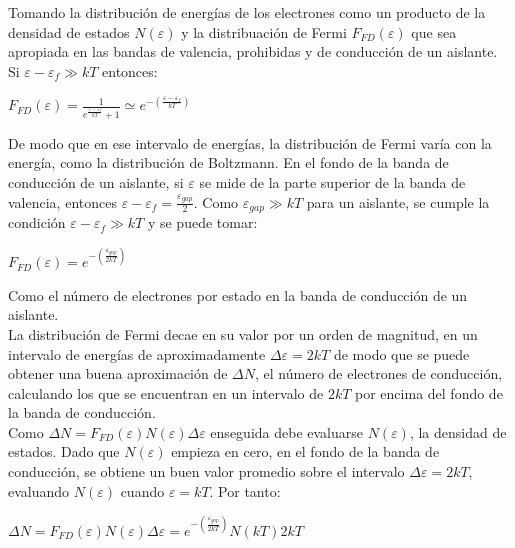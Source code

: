 \documentclass[oneside]{book}
\numberwithin{equation}{section}
\numberwithin{figure}{section}
\numberwithin{table}{section}
\begin{document}
				Tomando la distribución de energías de los electrones como un producto de la densidad de estados $N(\varepsilon)$ y la distribuación de Fermi $F_{FD}(\varepsilon)$ que sea apropiada en las bandas de valencia, prohibidas y de conducción de un aislante. Si $\varepsilon-\varepsilon_f \gg kT$ entonces:
				
				\begin{center}
					$\displaystyle F_{FD}(\varepsilon)=\frac{1}{e^{\frac{\varepsilon-\varepsilon_f}{kT}}+1} \simeq e^{-\left(\frac{\varepsilon-\varepsilon_f}{kT}\right)}$
				\end{center}
			
				De modo que en ese intervalo de energías, la distribución de Fermi varía con la energía, como la distribución de Boltzmann. En el fondo de la banda de conducción de un aislante, si $\varepsilon$ se mide de la parte superior de la banda de valencia, entonces $\displaystyle \varepsilon-\varepsilon_f=\frac{\varepsilon_{gap}}{2}$. Como $\varepsilon_{gap} \gg kT$ para un aislante, se cumple la condición $\varepsilon-\varepsilon_f \gg kT$ y se puede tomar:
				
				\begin{center}
					$\displaystyle F_{FD}(\varepsilon)=e^{-\left(\frac{\varepsilon_{gap}}{2kT}\right)}$
				\end{center}
						
				Como el número de electrones por estado en la banda de conducción de un aislante.\\
				
				La distribución de Fermi decae en su valor por un orden de magnitud, en un intervalo de energías de aproximadamente $\Delta \varepsilon=2kT$ de modo que se puede obtener una buena aproximación de $\Delta N$, el número de electrones de conducción, calculando los que se encuentran en un intervalo de $2kT$ por encima del fondo de la banda de conducción.\\
				
				Como $\Delta N=F_{FD}(\varepsilon)N(\varepsilon) \Delta \varepsilon$ enseguida debe evaluarse $N(\varepsilon)$, la densidad de estados. Dado que $N(\varepsilon)$ empieza en cero, en el fondo de la banda de conducción, se obtiene un buen valor promedio sobre el intervalo $\Delta \varepsilon=2kT$, evaluando $N(\varepsilon)$ cuando $\varepsilon=kT$. Por tanto:
				
				\begin{center}
					$\Delta N=F_{FD}(\varepsilon)N(\varepsilon) \Delta \varepsilon=e^{-\left(\frac{\varepsilon_{gap}}{2kT}\right)}N(kT)2kT$
				\end{center}
			
\end{document}
